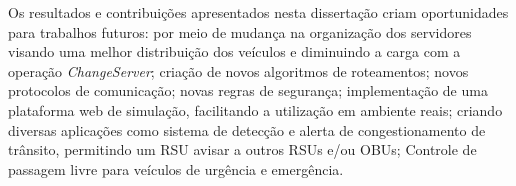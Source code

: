 \documentclass[
	12pt,				%
	oneside,			%
	a4paper,			%
	english,			%
	brazil				%
	]{abntex2ppgsi}
\begin{document}
Os resultados e contribuições apresentados nesta dissertação criam oportunidades para trabalhos futuros: por meio de mudança na organização dos servidores visando uma melhor distribuição dos veículos e diminuindo a carga com a operação \textit{ChangeServer}; criação de novos algoritmos de roteamentos; novos protocolos de comunicação; novas regras de segurança; implementação de uma plataforma web de simulação, facilitando a utilização em ambiente reais;  criando diversas aplicações como sistema de detecção e alerta de congestionamento de trânsito, permitindo um RSU avisar a outros RSUs e/ou OBUs; Controle de passagem livre para veículos de urgência e emergência.


\postextual



%
%






\end{document}
